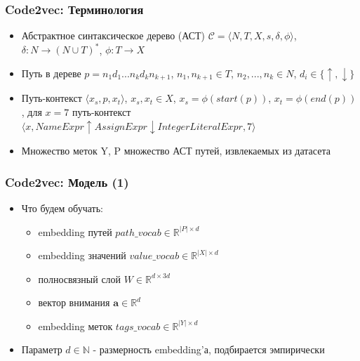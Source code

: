 \documentclass[xcolor=table,english]{beamer}
\begin{document}
\begin{frame}[fragile] \frametitle{Code2vec: Терминология}
    \begin{itemize}
        \item  Абстрактное синтаксическое дерево (АСТ) $\mathcal{C} = \langle N, T, X, s, \delta, \phi \rangle$, $\delta : N \rightarrow (N \cup T)^*$, $\phi : T \rightarrow X$
        \item Путь в дереве $p = n_1 d_1 ... n_k d_k n_{k+1}$, $n_1, n_{k+1} \in T$, $n_2, ..., n_k \in N$, $d_i \in \{ \uparrow, \downarrow \}$
        \item Путь-контекст $\langle x_s, p, x_t \rangle$, $x_s, x_t \in X$, $x_s = \phi(start(p))$, $x_t = \phi(end(p))$, для \textit{$x = 7$} путь-контекст $\langle x, NameExpr \uparrow AssignExpr \downarrow IntegerLiteralExpr, 7\rangle$
        \item Множество меток Y, P множество АСТ путей, извлекаемых из датасета
    \end{itemize}
\end{frame}

\begin{frame}[fragile] \frametitle{Code2vec: Модель (1)}
    \begin{itemize}
        \item Что будем обучать:
        {
            \begin{itemize}
                \item embedding путей $path\_vocab \in \mathbb{R}^{|P| \times d}$
                \item embedding значений $value\_vocab \in \mathbb{R}^{|X| \times d}$
                \item полносвязный слой $W \in \mathbb{R}^{d \times 3d}$
                \item вектор внимания $\textbf{a} \in \mathbb{R}^d$
                \item embedding меток $tags\_vocab \in \mathbb{R}^{|Y| \times d}$
            \end{itemize}
        }
        \item Параметр $d \in \mathbb{N}$ - размерность embedding'а, подбирается эмпирически
    \end{itemize}
\end{frame}
\end{document}
